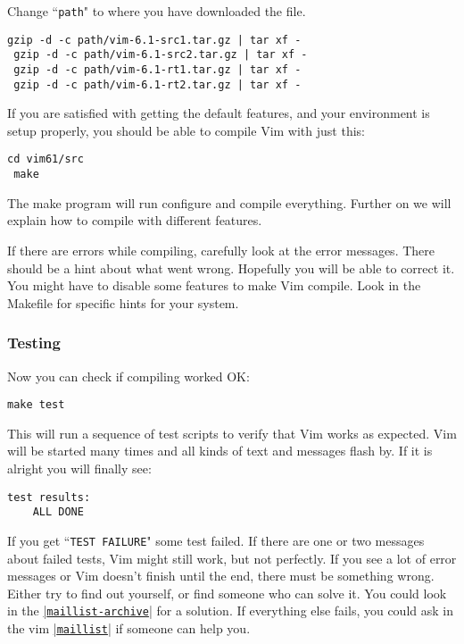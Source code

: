 Change ``\texttt{path}" to where you have downloaded the file.

\begin{Verbatim}[samepage=true]
 gzip -d -c path/vim-6.1-src1.tar.gz | tar xf -
 gzip -d -c path/vim-6.1-src2.tar.gz | tar xf -
 gzip -d -c path/vim-6.1-rt1.tar.gz | tar xf -
 gzip -d -c path/vim-6.1-rt2.tar.gz | tar xf -
\end{Verbatim}

If you are satisfied with getting the default features, and your environment is setup properly, you should be able to compile Vim with just this:

\begin{Verbatim}[samepage=true]
 cd vim61/src
 make
\end{Verbatim}

The make program will run configure and compile everything.
Further on we will explain how to compile with different features.

If there are errors while compiling, carefully look at the error messages.
There should be a hint about what went wrong.
Hopefully you will be able to correct it.
You might have to disable some features to make Vim compile.
Look in the Makefile for specific hints for your system.

\subsubsection{Testing}
Now you can check if compiling worked OK:

\begin{Verbatim}[samepage=true]
 make test
\end{Verbatim}

This will run a sequence of test scripts to verify that Vim works as expected.
Vim will be started many times and all kinds of text and messages flash by.
If it is alright you will finally see:

\begin{Verbatim}[samepage=true]
    test results:
    ALL DONE
\end{Verbatim}

If you get ``\texttt{TEST FAILURE}" some test failed.
If there are one or two messages about failed tests, Vim might still work, but not perfectly.
If you see a lot of error messages or Vim doesn't finish until the end, there must be something wrong.
Either try to find out yourself, or find someone who can solve it.
You could look in the \hyperref[maillist-archive]{|\texttt{maillist-archive}|} for a solution.
If everything else fails, you could ask in the vim \hyperref[maillist]{|\texttt{maillist}|} if someone can help you.

